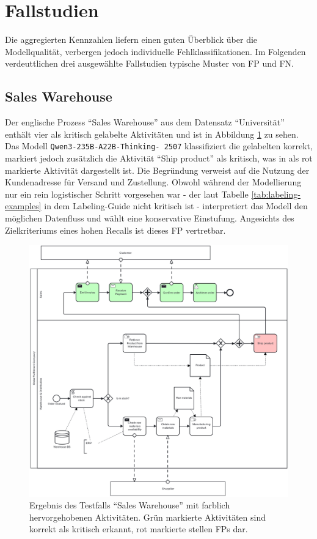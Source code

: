 \section{Fallstudien}\label{sec:fallstudien}

Die aggregierten Kennzahlen liefern einen guten Überblick über die Modellqualität, verbergen jedoch individuelle Fehlklassifikationen. Im Folgenden verdeuttlichen drei ausgewählte Fallstudien typische Muster von \ac{FP} und \ac{FN}.

\subsection*{Sales Warehouse}

Der englische Prozess \enquote{Sales Warehouse} aus dem Datensatz \enquote{Universität} enthält vier als kritisch gelabelte Aktivitäten und ist in Abbildung \ref{fig:qwen3-fall} zu sehen. Das Modell \texttt{Qwen3-235B-A22B-Thinking-\linebreak~2507} klassifiziert die gelabelten korrekt, markiert jedoch zusätzlich die Aktivität \enquote{Ship product} als kritisch, was in  als rot markierte Aktivität dargestellt ist. Die Begründung verweist auf die Nutzung der Kundenadresse für Versand und Zustellung. Obwohl während der Modellierung nur ein rein logistischer Schritt vorgesehen war - der laut Tabelle \ref{tab:labeling-examples} in dem Labeling-Guide nicht kritisch ist - interpretiert das Modell den möglichen Datenfluss und wählt eine konservative Einstufung. Angesichts des Zielkriteriums eines hohen Recalls ist dieses \ac{FP} vertretbar.

\begin{figure}
    \centering
    \includegraphics[height=.41\textheight]{images/results/examples/qwen3-235B-run-3-uni-sales-warehouse}
    \caption{Ergebnis des Testfalls \enquote{Sales Warehouse} mit farblich hervorgehobenen Aktivitäten. Grün markierte Aktivitäten sind korrekt als kritisch erkannt, rot markierte stellen \acp{FP} dar.}
    \label{fig:qwen3-fall}
\end{figure}

